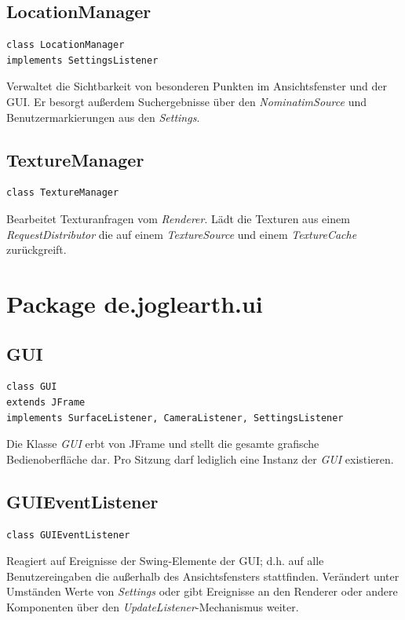 \documentclass[10pt]{scrreprt}
\begin{document}
\vspace{5mm}
\subsection*{LocationManager}
\begin{lstlisting}
class LocationManager
implements SettingsListener
\end{lstlisting}
Verwaltet die Sichtbarkeit von besonderen Punkten im Ansichtsfenster und der GUI. Er besorgt außerdem Suchergebnisse über den \textit{NominatimSource} und Benutzermarkierungen aus den \textit{Settings}.\\

\vspace{5mm}
\subsection*{TextureManager}
\begin{lstlisting}
class TextureManager
\end{lstlisting}
Bearbeitet Texturanfragen vom \textit{Renderer}. Lädt die Texturen aus einem \textit{RequestDistributor} die auf einem \textit{TextureSource} und einem \textit{TextureCache} zurückgreift.\\




\vspace{5mm}
\section{Package de.joglearth.ui}
\subsection*{GUI}
\begin{lstlisting}
class GUI
extends JFrame
implements SurfaceListener, CameraListener, SettingsListener
\end{lstlisting}
Die Klasse \textit{GUI} erbt von JFrame und stellt die gesamte grafische Bedienoberfläche dar. Pro Sitzung darf lediglich eine Instanz der \textit{GUI} existieren.\\

\vspace{5mm}
\subsection*{GUIEventListener}
\begin{lstlisting}
class GUIEventListener
\end{lstlisting}
Reagiert auf Ereignisse der Swing-Elemente der GUI; d.h. auf alle Benutzereingaben die außerhalb des Ansichtsfensters stattfinden. Verändert unter Umständen Werte von \textit{Settings} oder gibt Ereignisse an den Renderer oder andere Komponenten über den \textit{UpdateListener}-Mechanismus weiter.\\
\end{document}

